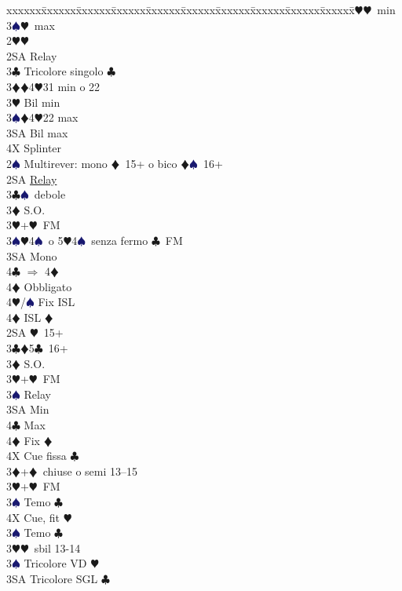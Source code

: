 \documentclass[a4paper,italian]{article}
\newcommand{\BC}{\textcolor{OliveGreen}{$\clubsuit$}}
\newcommand{\BD}{\textcolor{RedOrange}{$\vardiamondsuit$}}
\newcommand{\BH}{\textcolor{Red2}{$\varheartsuit${}}}
\newcommand{\BS}{\textcolor{MidnightBlue}{$\spadesuit${}}}
\newenvironment{bidtable}
{\begin{tabbing}

    xxxxxx\=xxxxxx\=xxxxxx\=xxxxxx\=xxxxxx\=xxxxxx\=xxxxxx\=xxxxxx\=xxxxxx\=xxxxxx\=\kill}
{\end{tabbing} }%
\begin{document}
\begin{multicols}{2}
\begin{bidtable}
        3\BH {}\BH\ min\\
        3\BS {}\BH\ max\-\-\\
        2\BH {}\BH \+\\
        2SA \> Relay\+\\
        3\BC \> Tricolore singolo \BC \\
        3\BD {}\BD 4\BH 31 min o 22\\
        3\BH \> Bil min\\
        3\BS {}\BD 4\BH 22 max\\
        3SA \> Bil max\\
        4X \> Splinter\-\-\\
        2\BS \> Multirever: mono \BD\ 15+ o bico \BD \BS\ 16+\+\\
        2SA \> \hyperref[multirever]{Relay}\\
        3\BC {}\BS\ debole\\
        3\BD \> S.O.\\
        3\BH {}+\BH\ FM\\
        3\BS {}\BH 4\BS\ o 5\BH 4\BS\ senza fermo \BC\ FM\+\\
        3SA \> Mono\\
        4\BC \> $\Rightarrow$ 4\BD \+\\
        4\BD \> Obbligato\+\\
        4\BH/\BS \> Fix ISL\-\-\\
        4\BD \> ISL \BD \-\-\\
        2SA \BH\ 15+\\
        3\BC {}\BD 5\BC\ 16+\+\\
        3\BD \> S.O.\\
        3\BH {}+\BH\ FM\\
        3\BS \> Relay\+\\
        3SA \> Min\\
        4\BC \> Max\+\\
        4\BD \> Fix \BD \\
        4X \> Cue fissa \BC \-\-\-\\
        3\BD {}+\BD\ chiuse o semi 13--15\+\\
        3\BH {}+\BH\ FM\+\\
        3\BS \> Temo \BC \\
        4X \> Cue, fit \BH \-\\
        3\BS \> Temo \BC \-\\
        3\BH {}\BH\ sbil 13-14\\
        3\BS \> Tricolore VD \BH \\
        3SA \> Tricolore SGL \BC \-
    \end{bidtable}


\end{multicols}
\end{document}
